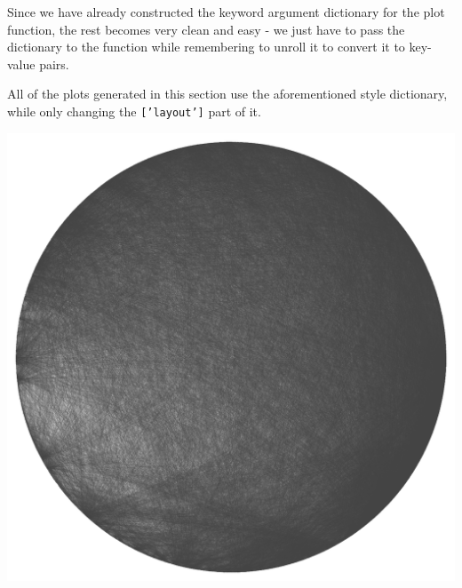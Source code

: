 \documentclass[12pt, a4paper]{article}
\begin{document}
Since we have already constructed the keyword argument dictionary for the plot function, the rest becomes very clean and easy - we just have to pass the dictionary to the function while remembering to unroll it to convert it to key-value pairs.

\newpage


All of the plots generated in this section use the aforementioned style dictionary, while only changing the \texttt{['layout']} part of it.

\begin{multicols}{2}
{\centering
\includegraphics[width=\columnwidth]{src/youtube/hdg/comp/1_plot_crc}\\
\label{fig:hdg_c1}}
{\centering
}
\end{multicols}
\end{document}
